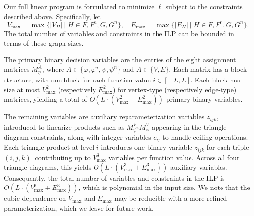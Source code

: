 %
Our full linear program is formulated to minimize $\ell$ subject to the constraints described above. Specifically, let
\[
V_{\max} = \max\{|V_H| \mid H \in F, F^n, G, G^n\}, \quad 
E_{\max} = \max\{|E_H| \mid H \in F, F^n, G, G^n\}.
\]
The total number of variables and constraints in the ILP can be bounded in terms of these graph sizes.

The primary binary decision variables are the entries of the eight assignment matrices $M_\eta^A$, where $A \in \{\varphi, \varphi^n, \psi, \psi^n\}$ and $A \in \{V, E\}$. Each matrix has a block structure, with one block for each function value $i \in [-L, L]$. Each block has size at most $V_{\max}^2$ (respectively $E_{\max}^2$) for vertex-type (respectively edge-type) matrices, yielding a total of $O\left(L \cdot (V_{\max}^2 + E_{\max}^2)\right)$ primary binary variables.

The remaining variables are auxiliary reparameterization variables $z_{ijk}$, introduced to linearize products such as $M_{\psi^n}^V M_\varphi^V$ appearing in the triangle-diagram constraints, along with integer variables $c_{ij}$ to handle ceiling operations. Each triangle product at level $i$ introduces one binary variable $z_{ijk}$ for each triple $(i,j,k)$, contributing up to $V_{\max}^3$ variables per function value. Across all four triangle diagrams, this yields $O\left(L \cdot (V_{\max}^3 + E_{\max}^3)\right)$ auxiliary variables.
%
Consequently, the total number of variables and constraints in the ILP is $O\left(L \cdot (V_{\max}^3 + E_{\max}^3)\right)$, which is polynomial in the input size. We note that the cubic dependence on $V_{\max}$ and $E_{\max}$ may be reducible with a more refined parameterization, which we leave for future work.
    
    
    
    


%

